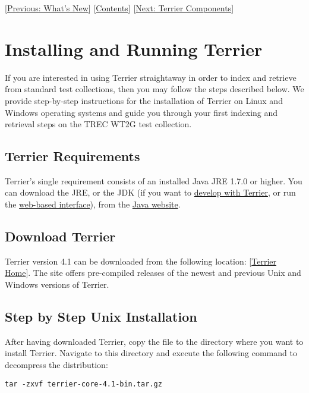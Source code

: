 {[}\href{whats_new.html}{Previous: What's New}{]}
{[}\href{index.html}{Contents}{]} {[}\href{basicComponents.html}{Next:
Terrier Components}{]}\\

\section{Installing and Running
Terrier}\label{installing-and-running-terrier}

If you are interested in using Terrier straightaway in order to index
and retrieve from standard test collections, then you may follow the
steps described below. We provide step-by-step instructions for the
installation of Terrier on Linux and Windows operating systems and guide
you through your first indexing and retrieval steps on the TREC WT2G
test collection.

\subsection{Terrier Requirements}\label{terrier-requirements}

Terrier's single requirement consists of an installed Java JRE 1.7.0 or
higher. You can download the JRE, or the JDK (if you want to
\href{terrier_develop.html}{develop with Terrier}, or run the
\href{terrier_http.html}{web-based interface}), from the
\href{http://www.oracle.com/technetwork/java/javase/downloads/index.html}{Java
website}.

\subsection{Download Terrier}\label{download-terrier}

Terrier version 4.1 can be downloaded from the following location:
{[}\href{http://terrier.org/}{Terrier Home}{]}. The site offers
pre-compiled releases of the newest and previous Unix and Windows
versions of Terrier.

\subsection{Step by Step Unix
Installation}\label{step-by-step-unix-installation}

After having downloaded Terrier, copy the file to the directory where
you want to install Terrier. Navigate to this directory and execute the
following command to decompress the distribution:

\begin{verbatim}
tar -zxvf terrier-core-4.1-bin.tar.gz
\end{verbatim}

